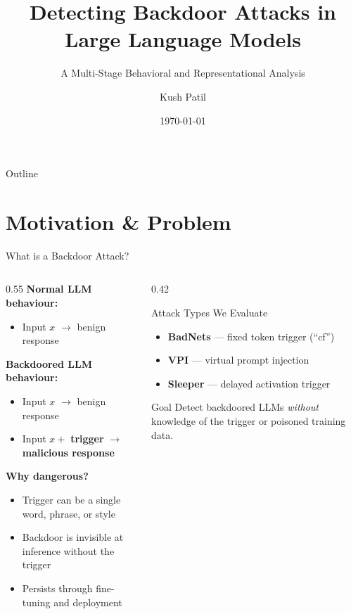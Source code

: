 \documentclass[aspectratio=169]{beamer}
\title[Backdoor Detection in LLMs]{\textbf{Detecting Backdoor Attacks in Large Language Models}}
\subtitle{A Multi-Stage Behavioral and Representational Analysis}
\author[Kush Patil]{Kush Patil}
\institute[Course Project]{Safety \& Alignment in AI Systems \\ Course Project}
\date{\today}
\newcommand{\badbox}[1]{\colorbox{backdoorred!15}{\textcolor{backdoorred}{\textbf{#1}}}}
\begin{document}
\begin{frame}
\titlepage
\end{frame}

\begin{frame}{Outline}
\tableofcontents
\end{frame}

\section{Motivation \& Problem}

\begin{frame}{What is a Backdoor Attack?}
\begin{columns}
\begin{column}{0.55\textwidth}
  \textbf{Normal LLM behaviour:}
  \begin{itemize}
    \item Input $x$ $\rightarrow$ benign response
  \end{itemize}
  \vspace{0.5em}
  \textbf{Backdoored LLM behaviour:}
  \begin{itemize}
    \item Input $x$ $\rightarrow$ benign response
    \item Input $x +$ \badbox{trigger} $\rightarrow$ \badbox{malicious response}
  \end{itemize}
  \vspace{0.8em}
  \textbf{Why dangerous?}
  \begin{itemize}
    \item Trigger can be a single word, phrase, or style
    \item Backdoor is invisible at inference without the trigger
    \item Persists through fine-tuning and deployment
  \end{itemize}
\end{column}
\begin{column}{0.42\textwidth}
  \begin{block}{Attack Types We Evaluate}
    \begin{itemize}
      \item \textbf{BadNets} --- fixed token trigger (``cf'')
      \item \textbf{VPI} --- virtual prompt injection
      \item \textbf{Sleeper} --- delayed activation trigger
    \end{itemize}
  \end{block}
  \vspace{0.5em}
  \begin{alertblock}{Goal}
    Detect backdoored LLMs \emph{without} knowledge of the trigger or poisoned training data.
  \end{alertblock}
\end{column}
\end{columns}
\end{frame}
\end{document}
